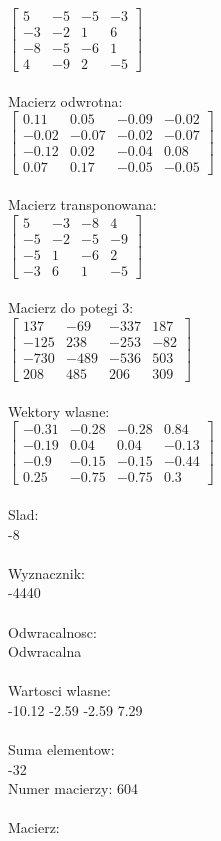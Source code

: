 \documentclass[a4paper,12pt]{article}
\begin{document}
$\begin{bmatrix} 5&-5&-5&-3\\-3&-2&1&6\\-8&-5&-6&1\\4&-9&2&-5 \end{bmatrix}$
\\
\\
Macierz odwrotna:\\

$\begin{bmatrix} 0.11&0.05&-0.09&-0.02\\-0.02&-0.07&-0.02&-0.07\\-0.12&0.02&-0.04&0.08\\0.07&0.17&-0.05&-0.05 \end{bmatrix}$
\\
\\
Macierz transponowana:\\

$\begin{bmatrix} 5&-3&-8&4\\-5&-2&-5&-9\\-5&1&-6&2\\-3&6&1&-5 \end{bmatrix}$
\\
\\
Macierz do potegi 3:\\

$\begin{bmatrix} 137&-69&-337&187\\-125&238&-253&-82\\-730&-489&-536&503\\208&485&206&309 \end{bmatrix}$
\\
\\
Wektory wlasne:\\

$\begin{bmatrix} -0.31&-0.28&-0.28&0.84\\-0.19&0.04&0.04&-0.13\\-0.9&-0.15&-0.15&-0.44\\0.25&-0.75&-0.75&0.3 \end{bmatrix}$
\\
\\
Slad:\\
-8
\\
\\
Wyznacznik:\\
-4440
\\
\\
Odwracalnosc:\\
Odwracalna
\\
\\
Wartosci wlasne:\\
-10.12 -2.59 -2.59 7.29
\\
\\
Suma elementow:\\
-32
\\
\newpage
Numer macierzy:
604
\\
\\
Macierz:\\
\end{document}
